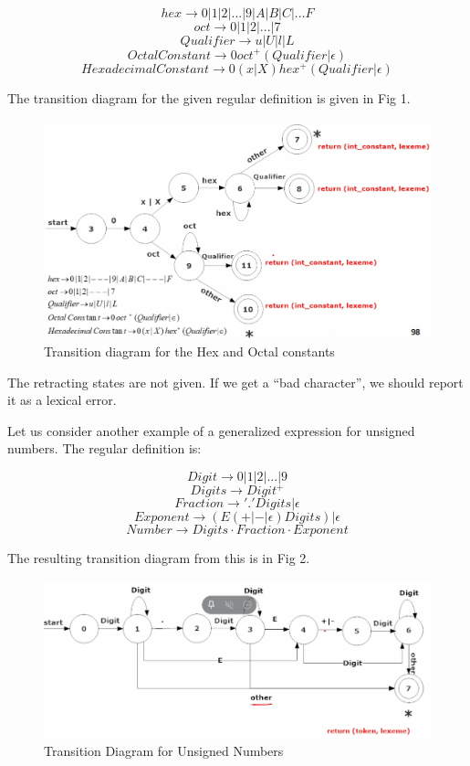 \documentclass[12pt,letterpaper]{amsbook}
\theoremstyle{definition}
\begin{document}
\[hex \rightarrow 0|1|2|...|9|A|B|C|...F\]
\[oct \rightarrow 0|1|2|...|7\]
\[Qualifier \rightarrow u|U|l|L\]
\[OctalConstant\rightarrow 0 oct^+(Qualifier|\epsilon)\]
\[HexadecimalConstant\rightarrow 0(x|X)hex^+(Qualifier|\epsilon)\]

The transition diagram for the given regular definition is given in Fig 1.

\begin{figure}[htpb]
  \centering
  \includegraphics[width=0.8\linewidth]{./assets/hex_oct_trans_diag.png}
  \caption{Transition diagram for the Hex and Octal constants}%
  \label{fig:}
\end{figure}

The retracting states are not given. If we get a ``bad character'', we should report it as a lexical error.

Let us consider another example of a generalized expression for unsigned numbers. The regular definition is:

\[Digit \rightarrow 0|1|2|...|9\]
\[Digits \rightarrow Digit^+\]
\[Fraction \rightarrow '.'Digits|\epsilon\]
\[Exponent \rightarrow (E(+|-|\epsilon)Digits)|\epsilon\]
\[Number \rightarrow Digits \cdot Fraction \cdot Exponent\]

The resulting transition diagram from this is in Fig 2.

\begin{figure}[htpb]
  \centering
  \includegraphics[width=0.8\linewidth]{./assets/unsigned_num_trans_diag.png}
  \caption{Transition Diagram for Unsigned Numbers}%
  \label{fig:}
\end{figure}
\end{document}

